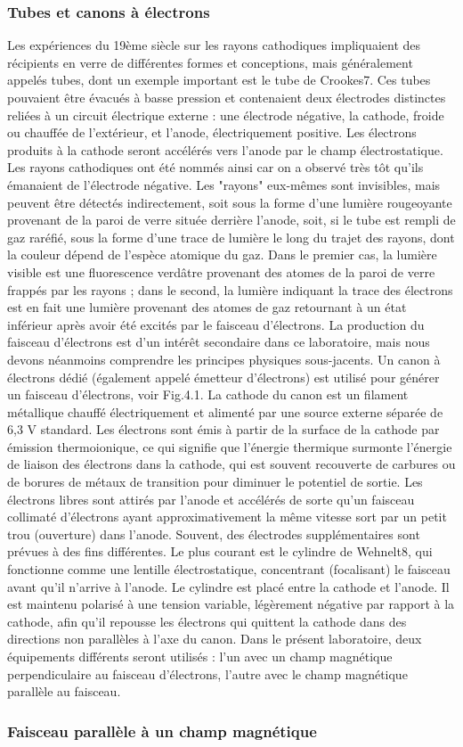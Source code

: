\documentclass[../main.tex]{subfiles}
\begin{document}
\subsubsection{Tubes et canons à électrons}
Les expériences du 19ème siècle sur les rayons cathodiques impliquaient des récipients en verre de différentes formes et conceptions, mais généralement appelés tubes, dont un exemple important est le tube de Crookes7. Ces tubes pouvaient être évacués à basse pression et contenaient deux électrodes distinctes reliées à un circuit électrique externe : une électrode négative, la cathode, froide ou chauffée de l'extérieur, et l'anode, électriquement positive. Les électrons produits à la cathode seront accélérés vers l'anode par le champ électrostatique. Les rayons cathodiques ont été nommés ainsi car on a observé très tôt qu'ils émanaient de l'électrode négative. Les "rayons" eux-mêmes sont invisibles, mais peuvent être détectés indirectement, soit sous la forme d'une lumière rougeoyante provenant de la paroi de verre située derrière l'anode, soit, si le tube est rempli de gaz raréfié, sous la forme d'une trace de lumière le long du trajet des rayons, dont la couleur dépend de l'espèce atomique du gaz. Dans le premier cas, la lumière visible est une fluorescence verdâtre provenant des atomes de la paroi de verre frappés par les rayons ; dans le second, la lumière indiquant la trace des électrons est en fait une lumière provenant des atomes de gaz retournant à un état inférieur après avoir été excités par le faisceau d'électrons. La production du faisceau d'électrons est d'un intérêt secondaire dans ce laboratoire, mais nous devons néanmoins comprendre les principes physiques sous-jacents. Un canon à électrons dédié (également appelé émetteur d'électrons) est utilisé pour générer un faisceau d'électrons, voir Fig.4.1. La cathode du canon est un filament métallique chauffé électriquement et alimenté par une source externe séparée de 6,3 V standard. Les électrons sont émis à partir de la surface de la cathode par émission thermoionique, ce qui signifie que l'énergie thermique surmonte l'énergie de liaison des électrons dans la cathode, qui est souvent recouverte de carbures ou de borures de métaux de transition pour diminuer le potentiel de sortie. Les électrons libres sont attirés par l'anode et accélérés de sorte qu'un faisceau collimaté d'électrons ayant approximativement la même vitesse sort par un petit trou (ouverture) dans l'anode. Souvent, des électrodes supplémentaires sont prévues à des fins différentes. Le plus courant est le cylindre de Wehnelt8, qui fonctionne comme une lentille électrostatique, concentrant (focalisant) le faisceau avant qu'il n'arrive à l'anode. Le cylindre est placé entre la cathode et l'anode. Il est maintenu polarisé à une tension variable, légèrement négative par rapport à la cathode, afin qu'il repousse les électrons qui quittent la cathode dans des directions non parallèles à l'axe du canon. Dans le présent laboratoire, deux équipements différents seront utilisés : l'un avec un champ magnétique perpendiculaire au faisceau d'électrons, l'autre avec le champ magnétique parallèle au faisceau.  \subsubsection{Faisceau parallèle à un champ magnétique}
\end{document}
